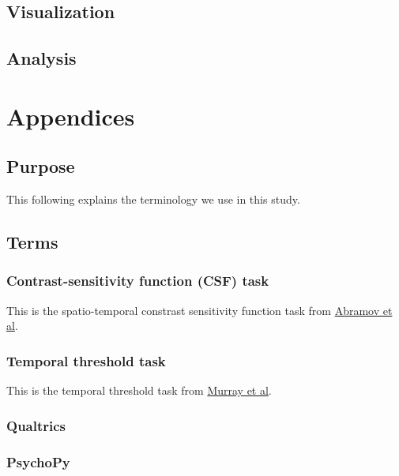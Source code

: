 \documentclass[]{article}
\begin{document}
\subsection{Visualization}\label{visualization}

\subsection{Analysis}\label{analysis}

\section{Appendices}\label{appendices}

\subsection{Purpose}\label{purpose-1}

This following explains the terminology we use in this study.

\subsection{Terms}\label{terms}

\subsubsection{Contrast-sensitivity function (CSF)
task}\label{contrast-sensitivity-function-csf-task}

This is the spatio-temporal constrast sensitivity function task from
\href{https://doi.org/10.1186/2042-6410-3-20}{Abramov et al}.

\subsubsection{Temporal threshold task}\label{temporal-threshold-task}

This is the temporal threshold task from
\href{https://doi.org/10.1016/j.cub.2018.06.014}{Murray et al}.

\subsubsection{Qualtrics}\label{qualtrics}

\subsubsection{PsychoPy}\label{psychopy}
\end{document}
